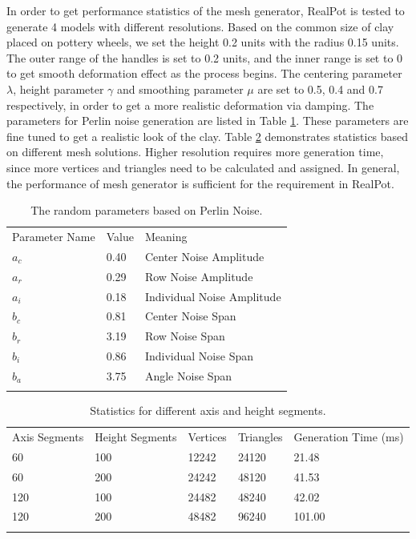 \documentclass{svjour3}                     %
\begin{document}
In order to get performance statistics of the mesh generator, RealPot is tested to generate 4 models with different resolutions.
Based on the common size of clay placed on pottery wheels, we set the height 0.2 units with the radius 0.15 units.
The outer range of the handles is set to 0.2 units, and the inner range is set to 0 to get smooth deformation effect as the process begins. The centering parameter $\lambda$, height parameter $\gamma$ and smoothing parameter $\mu$ are set to 0.5, 0.4 and 0.7 respectively, in order to get a more realistic deformation via damping. The parameters for Perlin noise generation are listed in Table \ref{tab:1}. These parameters are fine tuned to get a realistic look of the clay.
Table \ref{tab:2} demonstrates statistics based on different mesh solutions. Higher resolution requires more generation time, since more vertices and triangles need to be calculated and assigned. In general, the performance of mesh generator is sufficient for the requirement in RealPot.

\begin{table}
\caption{The random parameters based on Perlin Noise.}
\label{tab:1}       %
\begin{tabular}{lll}
\hline\noalign{\smallskip}
Parameter Name & Value & Meaning  \\
\noalign{\smallskip}\hline\noalign{\smallskip}
$a_{c}$ & 0.40 & Center Noise Amplitude \\
$a_{r}$ & 0.29 & Row Noise Amplitude \\
$a_{i}$ & 0.18 & Individual Noise Amplitude \\
$b_{c}$ & 0.81 & Center Noise Span \\
$b_{r}$ & 3.19 & Row Noise Span \\
$b_{i}$ & 0.86 & Individual Noise Span \\
$b_{a}$ & 3.75 & Angle Noise Span \\
\noalign{\smallskip}\hline
\end{tabular}
\end{table}

\begin{table}
\caption{Statistics for different axis and height segments.}
\label{tab:2}       %
\begin{tabular}{lllll}
\hline\noalign{\smallskip}
Axis Segments & Height Segments & Vertices & Triangles & Generation Time (ms)\\
\noalign{\smallskip}\hline\noalign{\smallskip}
60 & 100 & 12242 & 24120 & 21.48 \\
60 & 200 & 24242 & 48120 & 41.53 \\
120 & 100 & 24482 & 48240 & 42.02 \\
120 & 200 & 48482 & 96240 & 101.00 \\
\noalign{\smallskip}\hline
\end{tabular}
\end{table}
\end{document}
